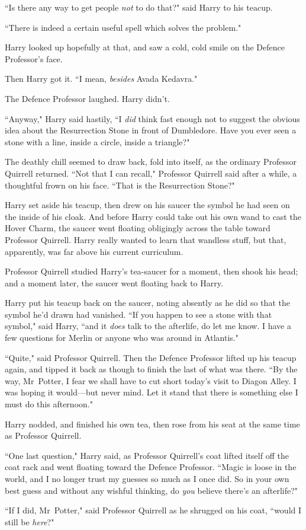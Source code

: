 ``Is there any way to get people \emph{not} to do that?" said Harry to his teacup.

``There is indeed a certain useful spell which solves the problem."

Harry looked up hopefully at that, and saw a cold, cold smile on the Defence Professor's face.

Then Harry got it. ``I mean, \emph{besides} Avada Kedavra."

The Defence Professor laughed. Harry didn't.

``Anyway," Harry said hastily, ``I \emph{did} think fast enough not to suggest the obvious idea about the Resurrection Stone in front of Dumbledore. Have you ever seen a stone with a line, inside a circle, inside a triangle?"

The deathly chill seemed to draw back, fold into itself, as the ordinary Professor Quirrell returned. ``Not that I can recall," Professor Quirrell said after a while, a thoughtful frown on his face. ``That is the Resurrection Stone?"

Harry set aside his teacup, then drew on his saucer the symbol he had seen on the inside of his cloak. And before Harry could take out his own wand to cast the Hover Charm, the saucer went floating obligingly across the table toward Professor Quirrell. Harry really wanted to learn that wandless stuff, but that, apparently, was far above his current curriculum.

Professor Quirrell studied Harry's tea-saucer for a moment, then shook his head; and a moment later, the saucer went floating back to Harry.

Harry put his teacup back on the saucer, noting absently as he did so that the symbol he'd drawn had vanished. ``If you happen to see a stone with that symbol," said Harry, ``and it \emph{does} talk to the afterlife, do let me know. I have a few questions for Merlin or anyone who was around in Atlantis."

``Quite," said Professor Quirrell. Then the Defence Professor lifted up his teacup again, and tipped it back as though to finish the last of what was there. ``By the way, Mr~Potter, I fear we shall have to cut short today's visit to Diagon Alley. I was hoping it would—but never mind. Let it stand that there is something else I must do this afternoon."

Harry nodded, and finished his own tea, then rose from his seat at the same time as Professor Quirrell.

``One last question," Harry said, as Professor Quirrell's coat lifted itself off the coat rack and went floating toward the Defence Professor. ``Magic is loose in the world, and I no longer trust my guesses so much as I once did. So in your own best guess and without any wishful thinking, do \emph{you} believe there's an afterlife?"

``If I did, Mr~Potter," said Professor Quirrell as he shrugged on his coat, ``would I still be \emph{here}?"

